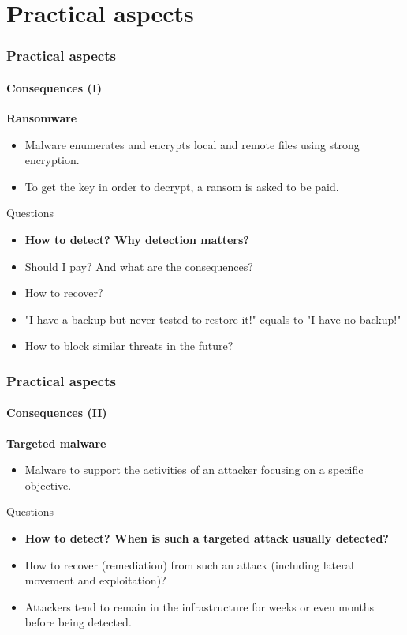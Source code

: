 \section{Practical aspects}


\begin{frame}[fragile]
\frametitle{Practical aspects}
\framesubtitle{Consequences (I)}
{\bf Ransomware}
\begin{itemize}
\item Malware enumerates and encrypts local and remote files using strong encryption.
\item To get the key in order to decrypt, a ransom is asked to be paid.
\end{itemize}
Questions
\begin{itemize}
\item {\bf How to detect? Why detection matters?}
\item Should I pay? And what are the consequences?
\item How to recover?
\item "I have a backup but never tested to restore it!" equals to "I have no backup!"
\item How to block similar threats in the future?
\end{itemize}
\end{frame}

\begin{frame}[fragile]
\frametitle{Practical aspects}
\framesubtitle{Consequences (II)}
{\bf Targeted malware}
\begin{itemize}
\item Malware to support the activities of an attacker focusing on a specific objective.
\end{itemize}
Questions
\begin{itemize}
\item {\bf How to detect? When is such a targeted attack usually detected?}
\item How to recover (remediation) from such an attack (including lateral movement and exploitation)?
\item Attackers tend to remain in the infrastructure for weeks or even months before being detected.
\end{itemize}

\end{frame}

